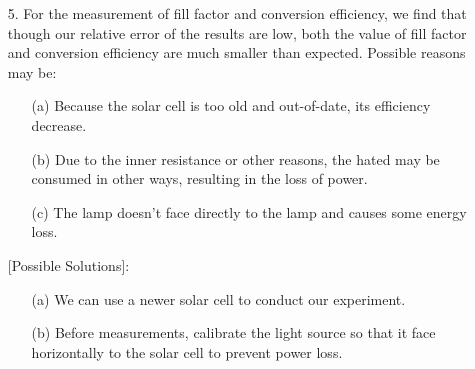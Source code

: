 \documentclass[a4paper,12pt]{article}
\begin{document}
\begin{itemize}
\item[5.] For the measurement of fill factor and conversion efficiency, we find that though our relative error of the results are low, both the value of fill factor and conversion efficiency are much smaller than expected. Possible reasons may be: 
		\begin{itemize}
		\item[(a)] Because the solar cell is too old and out-of-date, its efficiency decrease.
		\item[(b)] Due to the inner resistance or other reasons, the hated may be consumed in other ways, resulting in the loss of power. 
		\item[(c)] The lamp doesn't face directly to the lamp and causes some energy loss.
		\end{itemize}


		[Possible Solutions]:
		\begin{itemize}
		\item[(a)] We can use a newer solar cell to conduct our experiment.
		\item[(b)] Before measurements, calibrate the light source so that it face horizontally to the solar cell to prevent power loss.
		\end{itemize}
\end{itemize}
\end{document}
